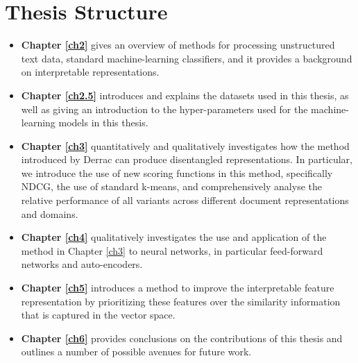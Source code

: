 





\section{Thesis Structure} \label{ch1:ths}

\begin{itemize}
	\item \textbf{Chapter \ref{ch2}} gives an overview of methods for processing unstructured text data, standard machine-learning classifiers, and it provides a background on interpretable representations.
	\item \textbf{Chapter \ref{ch2.5}} introduces and explains the datasets used in this thesis, as well as giving an introduction to the hyper-parameters  used for the machine-learning models in this thesis.
	\item \textbf{Chapter \ref{ch3}} quantitatively and qualitatively investigates how the method introduced by Derrac \cite{Derrac2015} can produce disentangled representations. In particular, we introduce the use of new scoring functions in this method, specifically NDCG, the use of standard k-means,  and comprehensively analyse the relative performance of all variants across different document representations and domains. 
	\item \textbf{Chapter \ref{ch4}} qualitatively investigates the use and application of the method in Chapter \ref{ch3} to neural networks, in particular feed-forward networks and auto-encoders.
	\item \textbf{Chapter \ref{ch5}} introduces a  method to improve the interpretable feature representation by prioritizing these features over the similarity information that is captured in the vector space.
	\item \textbf{Chapter \ref{ch6}} provides conclusions on the contributions of this thesis and outlines a number of possible avenues for future work.
\end{itemize}



